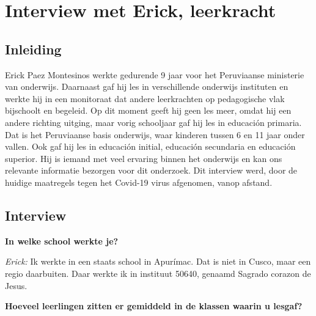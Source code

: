 
\chapter{Interview met Erick, leerkracht}
\label{ch:interviewErick}

\section{Inleiding}
Erick Paez Montesinos werkte gedurende 9 jaar voor het Peruviaanse ministerie van onderwijs. Daarnaast gaf hij les in verschillende onderwijs instituten en werkte hij in een monitoraat dat andere leerkrachten op pedagogische vlak bijschoolt en begeleid. Op dit moment geeft hij geen les meer, omdat hij een andere richting uitging, maar vorig schooljaar gaf hij les in educación primaria. Dat is het Peruviaanse basis onderwijs, waar kinderen tussen 6 en 11 jaar onder vallen. \autocite{Nuffic2015} Ook gaf hij les in educación initial, educación secundaria en educación superior. Hij is iemand met veel ervaring binnen het onderwijs en kan ons relevante informatie bezorgen voor dit onderzoek. Dit interview werd, door de huidige maatregels tegen het Covid-19 virus afgenomen, vanop afstand.


\section{Interview}

\textbf{In welke school werkte je?}

\textit{Erick:} Ik werkte in een staats school in Apurímac. Dat is niet in Cusco, maar een regio daarbuiten. Daar werkte ik in instituut 50640, genaamd Sagrado corazon de Jesus.

\textbf{Hoeveel leerlingen zitten er gemiddeld in de klassen waarin u lesgaf?}

